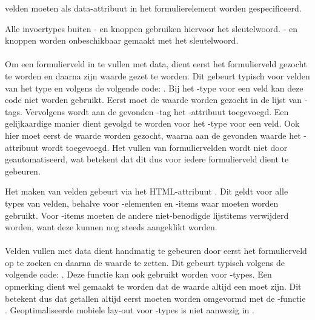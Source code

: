  velden moeten als data-attribuut in het formulierelement worden gespecificeerd.

Alle invoertypes buiten - en knoppen gebruiken hiervoor het  sleutelwoord.
- en knoppen worden onbeschikbaar gemaakt met het  sleutelwoord.

\paragraph{\jqm}
Om een formulierveld in te vullen met data, dient eerst het formulierveld gezocht te worden en daarna zijn waarde gezet te worden.
Dit gebeurt typisch voor velden van het type  en  volgens de volgende code: .
Bij het -type voor een veld kan deze code niet worden gebruikt.
Eerst moet de waarde worden gezocht in de lijst van -tags.
Vervolgens wordt aan de gevonden -tag het -attribuut toegevoegd.
Een gelijkaardige manier dient gevolgd te worden voor het -type voor een veld.
Ook hier moet eerst de waarde worden gezocht, waarna aan de gevonden waarde het -attribuut wordt toegevoegd.
Het vullen van formuliervelden wordt niet door \jqm{} geautomatiseerd, wat betekent dat dit dus voor iedere formulierveld dient te gebeuren.

Het  maken van velden gebeurt via het HTML-attribuut .
Dit geldt voor alle types van velden, behalve voor -elementen en -items waar  moeten worden gebruikt.
Voor -items moeten de andere niet-benodigde lijstitems verwijderd worden, want deze kunnen nog steeds aangeklikt worden.

\paragraph{\lungo}
Velden vullen met data dient handmatig te gebeuren door eerst het formulierveld op te zoeken en daarna de waarde te zetten.
Dit gebeurt typisch volgens de volgende code: .
Deze functie kan ook gebruikt worden voor -types.
Een opmerking dient wel gemaakt te worden dat de waarde altijd een  moet zijn.
Dit betekent dus dat getallen altijd eerst moeten worden omgevormd met de \js{}-functie . 
Geoptimaliseerde mobiele lay-out voor -types is niet aanwezig in \lungo.

